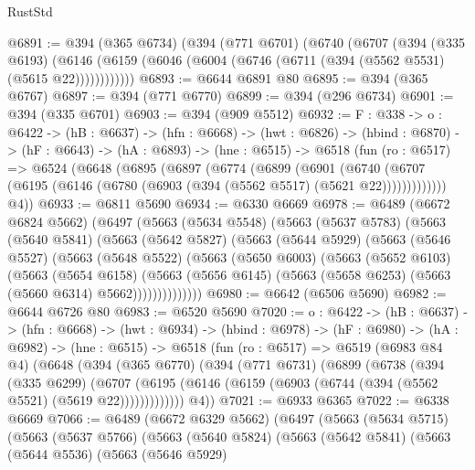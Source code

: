 \begin{lexlean}{RustStd}
\begin{coremodule}
@6891 := @394
    (@365 @6734)
    (@394
      (@771 @6701)
      (@6740
        (@6707
          (@394
            (@335 @6193)
            (@6146 (@6159 (@6046 (@6004 (@6746 (@6711 (@394 (@5562 @5531) (@5615 @22))))))))))))
@6893 := @6644 @6891 @80
@6895 := @394 (@365 @6767)
@6897 := @394 (@771 @6770)
@6899 := @394 (@296 @6734)
@6901 := @394 (@335 @6701)
@6903 := @394 (@909 @5512)
@6932 := {F : @338} ->
  {o : @6422} ->
  (hB : @6637) ->
  (hfn : @6668) ->
  (hwt : @6826) ->
  (hbind : @6870) ->
  (hF : @6643) ->
  (hA : @6893) ->
  (hne : @6515) ->
  @6518
    (fun (ro : @6517) =>
    @6524
      (@6648
        (@6895
          (@6897
            (@6774
              (@6899
                (@6901
                  (@6740
                    (@6707 (@6195 (@6146 (@6780 (@6903 (@394 (@5562 @5517) (@5621 @22)))))))))))))
        @4))
@6933 := @6811 @5690
@6934 := @6330 @6669
@6978 := @6489
    (@6672 @6824 @5662)
    (@6497
      (@5663
        (@5634 @5548)
        (@5663
          (@5637 @5783)
          (@5663
            (@5640 @5841)
            (@5663
              (@5642 @5827)
              (@5663
                (@5644 @5929)
                (@5663
                  (@5646 @5527)
                  (@5663
                    (@5648 @5522)
                    (@5663
                      (@5650 @6003)
                      (@5663
                        (@5652 @6103)
                        (@5663
                          (@5654 @6158)
                          (@5663
                            (@5656 @6145)
                            (@5663 (@5658 @6253) (@5663 (@5660 @6314) @5662))))))))))))))
@6980 := @6642 (@6506 @5690)
@6982 := @6644 @6726 @80
@6983 := @6520 @5690
@7020 := {o : @6422} ->
  (hB : @6637) ->
  (hfn : @6668) ->
  (hwt : @6934) ->
  (hbind : @6978) ->
  (hF : @6980) ->
  (hA : @6982) ->
  (hne : @6515) ->
  @6518
    (fun (ro : @6517) =>
    @6519
      (@6983 @84 @4)
      (@6648
        (@394
          (@365 @6770)
          (@394
            (@771 @6731)
            (@6899
              (@6738
                (@394
                  (@335 @6299)
                  (@6707
                    (@6195 (@6146 (@6159 (@6903 (@6744 (@394 (@5562 @5521) (@5619 @22)))))))))))))
        @4))
@7021 := @6933 @6365
@7022 := @6338 @6669
@7066 := @6489
    (@6672 @6329 @5662)
    (@6497
      (@5663
        (@5634 @5715)
        (@5663
          (@5637 @5766)
          (@5663
            (@5640 @5824)
            (@5663
              (@5642 @5841)
              (@5663
                (@5644 @5536)
                (@5663
                  (@5646 @5929)

\end{coremodule}
\end{lexlean}
